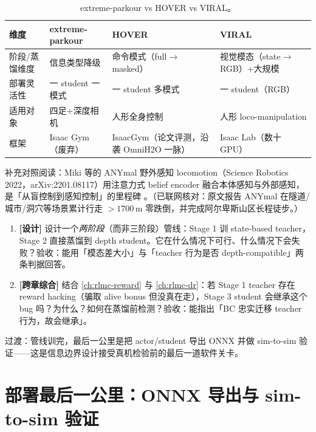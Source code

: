\begin{table}[H]
\centering
\small
\caption{extreme-parkour vs HOVER vs VIRAL。}
\label{tab:rlmc-priv-frontier}
\begin{tabular}{@{}llll@{}}
\toprule
维度 & extreme-parkour & HOVER & VIRAL \\
\midrule
阶段/蒸馏维度 & 信息类型降级 & 命令模式（full$\to$masked） & 视觉模态（state$\to$RGB）+大规模 \\
部署灵活性 & 一 student 一模式 & 一 student 多模式 & 一 student（RGB） \\
适用对象 & 四足+深度相机 & 人形全身控制 & 人形 loco-manipulation \\
框架 & Isaac Gym（废弃） & IsaacGym（论文评测，沿袭 OmniH2O 一脉） & Isaac Lab（数十 GPU） \\
\bottomrule
\end{tabular}
\end{table}

补充对照阅读：Miki 等的 ANYmal 野外感知 locomotion（Science Robotics 2022，arXiv:2201.08117）用注意力式 belief encoder 融合本体感知与外部感知，是「从盲控制到感知控制」的里程碑 \cite{miki2022perceptive}。（已联网核对：原文报告 ANYmal 在隧道/城市/洞穴等场景累计行走 $>1700$\,m 零跌倒，并完成阿尔卑斯山区长程徒步。）

\begin{practice}[本节练习]
\begin{enumerate}
  \item \textbf{[设计]} 设计一个\emph{两阶段}（而非三阶段）管线：Stage 1 训 state-based teacher，Stage 2 直接蒸馏到 depth student。它在什么情况下可行、什么情况下会失败？验收：能用「模态差大小」与「teacher 行为是否 depth-compatible」两条判据回答。
  \item \textbf{[跨章综合]} 结合 \cref{ch:rlmc-reward} 与 \cref{ch:rlmc-dr}：若 Stage 1 teacher 存在 reward hacking（骗取 alive bonus 但没真在走），Stage 3 student 会继承这个 bug 吗？为什么？如何在蒸馏前检测？验收：能指出「BC 忠实迁移 teacher 行为，故会继承」。
\end{enumerate}
\end{practice}

过渡：管线训完，最后一公里是把 actor/student 导出 ONNX 并做 sim-to-sim 验证——这是信息边界设计接受真机检验前的最后一道软件关卡。

\section{部署最后一公里：ONNX 导出与 sim-to-sim 验证}
\label{sec:rlmc-priv-onnx}

